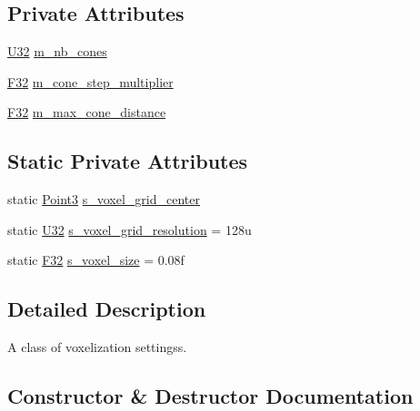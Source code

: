 \subsection*{Private Attributes}
\begin{DoxyCompactItemize}
\item 
\hyperlink{namespacemage_a41c104c036fba3756a74e19f793eeaa1}{U32} \hyperlink{classmage_1_1rendering_1_1_voxelization_settings_a14a93b638fced273f7beab95c1caf929}{m\+\_\+nb\+\_\+cones}
\item 
\hyperlink{namespacemage_aa97e833b45f06d60a0a9c4fc22ae02c0}{F32} \hyperlink{classmage_1_1rendering_1_1_voxelization_settings_a4d58d4ab9b43d2631415da65321a8c83}{m\+\_\+cone\+\_\+step\+\_\+multiplier}
\item 
\hyperlink{namespacemage_aa97e833b45f06d60a0a9c4fc22ae02c0}{F32} \hyperlink{classmage_1_1rendering_1_1_voxelization_settings_adb6172810eba8f59553bcbb9e2a7cbe3}{m\+\_\+max\+\_\+cone\+\_\+distance}
\end{DoxyCompactItemize}
\subsection*{Static Private Attributes}
\begin{DoxyCompactItemize}
\item 
static \hyperlink{structmage_1_1_point3}{Point3} \hyperlink{classmage_1_1rendering_1_1_voxelization_settings_a37151063ebbf6ae6ea193fb0ce05d270}{s\+\_\+voxel\+\_\+grid\+\_\+center}
\item 
static \hyperlink{namespacemage_a41c104c036fba3756a74e19f793eeaa1}{U32} \hyperlink{classmage_1_1rendering_1_1_voxelization_settings_aa709675f6700320077718e1954854ca6}{s\+\_\+voxel\+\_\+grid\+\_\+resolution} = 128u
\item 
static \hyperlink{namespacemage_aa97e833b45f06d60a0a9c4fc22ae02c0}{F32} \hyperlink{classmage_1_1rendering_1_1_voxelization_settings_a647150f56ef8546b6e18f5ad8dd2e661}{s\+\_\+voxel\+\_\+size} = 0.\+08f
\end{DoxyCompactItemize}


\subsection{Detailed Description}
A class of voxelization settingss. 

\subsection{Constructor \& Destructor Documentation}
\hypertarget{classmage_1_1rendering_1_1_voxelization_settings_a5c866be104571097091b07f113b2f680}{}\label{classmage_1_1rendering_1_1_voxelization_settings_a5c866be104571097091b07f113b2f680} 
